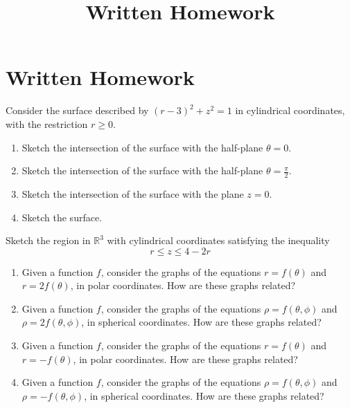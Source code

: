 \documentclass{ximera}
\title{Written Homework}
\begin{document}
\begin{abstract}
\end{abstract}
\maketitle

\section{Written Homework}

\begin{problem}
Consider the surface described by $(r-3)^2 +z^2 = 1$ in cylindrical coordinates, with the restriction $r\geq 0$.
\begin{enumerate}
\item Sketch the intersection of the surface with the half-plane $\theta = 0$.
\item Sketch the intersection of the surface with the half-plane $\theta = \frac{\pi}{2}$.
\item Sketch the intersection of the surface with the plane $z = 0$. 
\item Sketch the surface.
\end{enumerate}
\end{problem}

\begin{problem}
Sketch the region in $\mathbb{R}^3$ with cylindrical coordinates satisfying the inequality
\[
r\leq z \leq 4-2r
\]
\end{problem}

\begin{problem}
\begin{enumerate}
\item Given a function $f$, consider the graphs of the equations $r = f(\theta)$ and $r = 2f(\theta)$, in polar coordinates. How are these graphs related?
\item Given a function $f$, consider the graphs of the equations $\rho = f(\theta, \phi)$ and $\rho = 2f(\theta, \phi)$, in spherical coordinates. How are these graphs related?
\item Given a function $f$, consider the graphs of the equations $r = f(\theta)$ and $r = -f(\theta)$, in polar coordinates. How are these graphs related?
\item Given a function $f$, consider the graphs of the equations $\rho = f(\theta, \phi)$ and $\rho = -f(\theta, \phi)$, in spherical coordinates. How are these graphs related?
\end{enumerate}
\end{problem}
\end{document}
